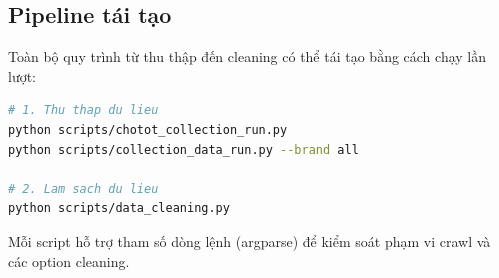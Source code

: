 \subsection{Pipeline tái tạo}

Toàn bộ quy trình từ thu thập đến cleaning có thể tái tạo bằng cách chạy lần lượt:
\begin{lstlisting}[language=bash, caption={Lệnh tái tạo dữ liệu}, label={lst:reproduce}]
# 1. Thu thap du lieu
python scripts/chotot_collection_run.py
python scripts/collection_data_run.py --brand all

# 2. Lam sach du lieu
python scripts/data_cleaning.py
\end{lstlisting}

Mỗi script hỗ trợ tham số dòng lệnh (argparse) để kiểm soát phạm vi crawl và các option cleaning.
